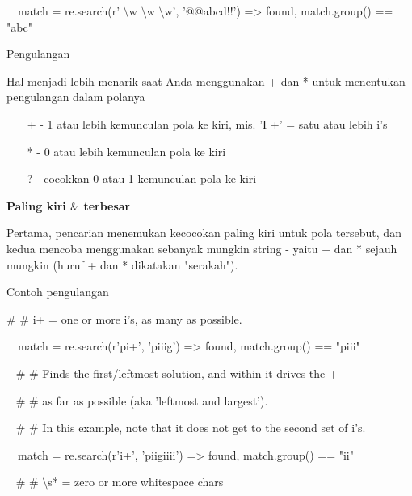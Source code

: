 \begin{12pt}
\begin{12pt}
\noindent 
~~match = re.search(r' $  \setminus  $w $  \setminus  $w $  \setminus  $w', '@@abcd!!') =>  found, match.group() == "abc" \par
\vspace{12pt}
\vspace{12pt}
\noindent 
Pengulangan \par
\vspace{12pt}
\noindent 
Hal menjadi lebih menarik saat Anda menggunakan + dan * untuk menentukan pengulangan dalam polanya \par
\vspace{12pt}
\noindent 
~~~ + - 1 atau lebih kemunculan pola ke kiri, mis. 'I +' = satu atau lebih i's \par
\noindent 
~~~ * - 0 atau lebih kemunculan pola ke kiri \par
\noindent 
~~~ ? - cocokkan 0 atau 1 kemunculan pola ke kiri \par
\vspace{12pt}
\vspace{14pt}
\noindent 
{\fontsize{14pt}{14pt}\selectfont \textbf{Paling kiri  $  \&  $ terbesar} \\} \par
Pertama, pencarian menemukan kecocokan paling kiri untuk pola tersebut, dan kedua mencoba menggunakan sebanyak mungkin string - yaitu + dan * sejauh mungkin (huruf + dan * dikatakan "serakah"). \par
\noindent 
Contoh pengulangan \par
\vspace{12pt}
\noindent 
 $  \#  $ $  \#  $ i+ = one or more i's, as many as possible. \par
\noindent 
~~match = re.search(r'pi+', 'piiig') =>  found, match.group() == "piii" \par
\vspace{12pt}
\noindent 
~  $  \#  $ $  \#  $ Finds the first/leftmost solution, and within it drives the + \par
\noindent 
~  $  \#  $ $  \#  $ as far as possible (aka 'leftmost and largest'). \par
\noindent 
~  $  \#  $ $  \#  $ In this example, note that it does not get to the second set of i's. \par
\noindent 
~~match = re.search(r'i+', 'piigiiii') =>  found, match.group() == "ii" \par
\vspace{12pt}
\noindent 
~  $  \#  $ $  \#  $  $  \setminus  $s* = zero or more whitespace chars \par

\end{12pt}
\end{12pt}
